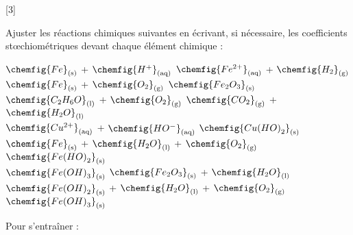 [3]

\numeroQuestion
Ajuster les réactions chimiques suivantes en écrivant, si nécessaire, les coefficients stœchiométriques devant chaque élément chimique :
\newcommand{\localEcart}{16}
\begin{center}
   $\chemfig{Fe}\sol$ +  $\chemfig{H^{+}}\aq$
  \reaction {} $\chemfig{Fe^{2+}}\aq$ +  $\chemfig{H_2}\gaz$
  \\[\localEcart pt]
   $\chemfig{Fe}\sol$ +  $\chemfig{O_2}\gaz$
  \reaction {} $\chemfig{Fe_2O_3}\sol$
  \\[\localEcart pt]
   $\chemfig{C_2H_6O}\liq$ +  $\chemfig{O_2}\gaz$
  \reaction {} $\chemfig{CO_2}\gaz$ +  $\chemfig{H_2O}\liq$
  \\[\localEcart pt]
   $\chemfig{Cu^{2+}}\aq$ +  $\chemfig{HO^{-}}\aq$
  \reaction {} $\chemfig{Cu{(HO)}_2}\sol$
  \\[\localEcart pt]
   $\chemfig{Fe}\sol$ +  $\chemfig{H_2O}\liq$ +  $\chemfig{O_2}\gaz$
  \reaction {} $\chemfig{Fe{(HO)}_2}\sol$
  \\[\localEcart pt]
   $\chemfig{Fe{(OH)}_3}\sol$
  \reaction {} $\chemfig{Fe_2O_3}\sol$ +  $\chemfig{H_2O}\liq$
  \\[\localEcart pt]
   $\chemfig{Fe{(OH)}_2}\sol$ +  $\chemfig{H_2O}\liq$ +  $\chemfig{O_2}\gaz$
  \reaction {} $\chemfig{Fe{(OH)}_3}\sol$
  \\[\localEcart pt]
\end{center}

\begin{wrapfigure}[1]{r}{0.1\linewidth}
  \centering
\end{wrapfigure}
\numeroQuestion Pour s'entraîner :